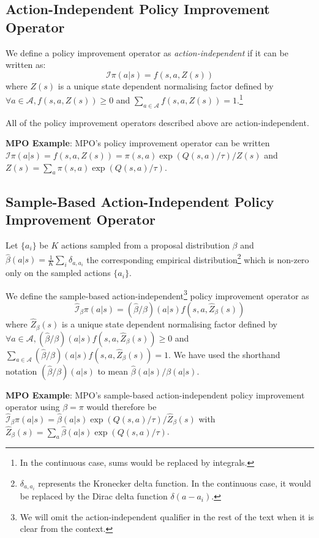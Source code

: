 \documentclass{article}
\newcommand{\ipi}{\mathcal{I}\pi}
\newcommand{\sample}{\beta}
\newcommand{\ibpi}{\hat{\mathcal{I}}_{\sample}\pi}
\begin{document}
\subsection{Action-Independent Policy Improvement Operator}
\label{action-indep}
We define a policy improvement operator as \emph{action-independent} if it can be written as:
$$
\ipi(a|s) = f(s, a , Z(s))
$$
where $Z(s)$ is a unique state dependent normalising factor defined by $\forall a\in\mathcal{A}, f(s, a, Z(s))\geq 0$ and $\sum_{a\in\mathcal{A}} f(s, a, Z(s))=1$.\footnote{In the continuous case, sums would be replaced by integrals.}

All of the policy improvement operators described above are action-independent.

\textbf{MPO Example}: MPO's policy improvement operator can be written $\ipi(a|s) = f(s,a,Z(s)) = \pi(s, a) \exp(Q(s, a)/\tau)/Z(s)$ and $Z(s)=\sum_a \pi(s, a) \exp(Q(s, a)/\tau)$.


\subsection{Sample-Based Action-Independent Policy Improvement Operator}
Let $\{a_i\}$ be $K$ actions sampled from a proposal distribution $\sample$ and $\hat{\sample}(a|s)=\frac{1}{K} \sum_i \delta_{a, a_i}$ the corresponding empirical distribution\footnote{$\delta_{a,a_i}$ represents the Kronecker delta function. In the continuous case, it would be replaced by the Dirac delta function $\delta(a-a_i)$.} which is non-zero only on the sampled actions $\{a_i\}$.

We define the sample-based action-independent\footnote{We will omit the action-independent qualifier in the rest of the text when it is clear from the context.} policy improvement operator as
$$
\ibpi(a|s) = (\hat{\sample}/\sample)(a|s) f(s, a, \hat{Z}_\sample(s))
$$
where $\hat{Z}_\sample(s)$ is a unique state dependent normalising factor defined by $\forall a\in\mathcal{A}, (\hat{\sample}/\sample)(a|s) f(s, a, \hat{Z}_\sample(s))\geq 0$ and $\sum_{a\in\mathcal{A}}(\hat{\sample}/\sample)(a|s) f(s, a, \hat{Z}_\sample(s))=1$.
We have used the shorthand notation $(\hat{\sample}/\sample)(a|s)$ to mean $\hat{\sample}(a|s)/\sample(a|s)$.

\textbf{MPO Example}: MPO's sample-based action-independent policy improvement operator using $\sample=\pi$ would therefore be $\ibpi(a|s) = \hat{\sample}(a|s)\exp(Q(s, a)/\tau)/\hat{Z}_\sample(s)$ with $\hat{Z}_\sample(s)=\sum_a \hat{\sample}(a|s)\exp(Q(s, a)/\tau)$.
\end{document}
